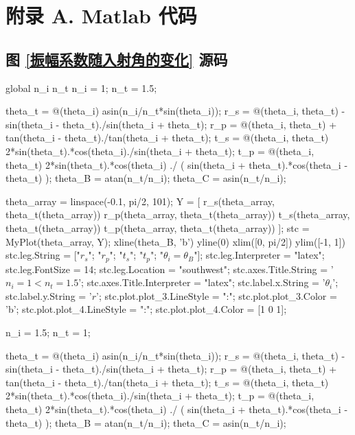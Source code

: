 \documentclass[UTF8]{report}
\theoremstyle{MyLineTheoremStyle} %
\theoremstyle{MyBlockTheoremStyle} %
\theoremstyle{MySubsubsectionStyle} %
\begin{document}
\chapter*{附录 A. Matlab 代码}   
\thispagestyle{fancy} 
\setcounter{section}{0}   
\renewcommand\thesection{A.\arabic{section}}   
\renewcommand{\thefigure}{A.\arabic{figure}} 
\renewcommand{\thetable}{A.\arabic{table}}

\section{图 \ref{振幅系数随入射角的变化} 源码}\label{图振幅系数随入射角的变化源码}
\begin{matlablisting}
global n_i n_t
n_i = 1;
n_t = 1.5;

theta_t = @(theta_i) asin(n_i/n_t*sin(theta_i));
r_s = @(theta_i, theta_t) - sin(theta_i - theta_t)./sin(theta_i + theta_t);
r_p = @(theta_i, theta_t) + tan(theta_i - theta_t)./tan(theta_i + theta_t);
t_s = @(theta_i, theta_t) 2*sin(theta_t).*cos(theta_i)./sin(theta_i + theta_t);
t_p = @(theta_i, theta_t) 2*sin(theta_t).*cos(theta_i) ./ ( sin(theta_i + theta_t).*cos(theta_i - theta_t) );
theta_B = atan(n_t/n_i);
theta_C = asin(n_t/n_i);

theta_array = linspace(-0.1, pi/2, 101);
Y = [
    r_s(theta_array, theta_t(theta_array))
    r_p(theta_array, theta_t(theta_array))
    t_s(theta_array, theta_t(theta_array))
    t_p(theta_array, theta_t(theta_array))
    ];
stc = MyPlot(theta_array, Y);
xline(theta_B, 'b')
yline(0)
xlim([0, pi/2])
ylim([-1, 1])
stc.leg.String = ["$r_s$"; "$r_p$"; "$t_s$"; "$t_p$"; "$\theta_i = \theta_B$"];
stc.leg.Interpreter = "latex";
stc.leg.FontSize = 14;
stc.leg.Location = "southwest";
stc.axes.Title.String = '$n_i = 1 < n_t = 1.5$';
stc.axes.Title.Interpreter = "latex";
stc.label.x.String = '$\theta_i$';
stc.label.y.String = '$r$';
stc.plot.plot_3.LineStyle = ":";
stc.plot.plot_3.Color = 'b';
stc.plot.plot_4.LineStyle = ":";
stc.plot.plot_4.Color = [1 0 1];

n_i = 1.5;
n_t = 1;

theta_t = @(theta_i) asin(n_i/n_t*sin(theta_i));
r_s = @(theta_i, theta_t) - sin(theta_i - theta_t)./sin(theta_i + theta_t);
r_p = @(theta_i, theta_t) + tan(theta_i - theta_t)./tan(theta_i + theta_t);
t_s = @(theta_i, theta_t) 2*sin(theta_t).*cos(theta_i)./sin(theta_i + theta_t);
t_p = @(theta_i, theta_t) 2*sin(theta_t).*cos(theta_i) ./ ( sin(theta_i + theta_t).*cos(theta_i - theta_t) );
theta_B = atan(n_t/n_i);
theta_C = asin(n_t/n_i);



\end{matlablisting}
\end{document}
